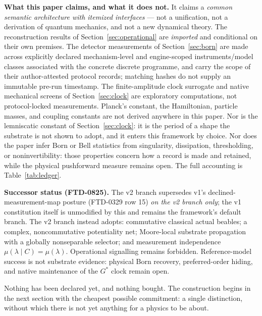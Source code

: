 \documentclass[11pt,a4paper]{article}
\theoremstyle{definition}
\theoremstyle{plain}
\theoremstyle{remark}
\begin{document}
\begin{scopebox}
\textbf{What this paper claims, and what it does not.} It claims a
\emph{common semantic architecture with itemized interfaces} --- not a
unification, not a derivation of quantum mechanics, and not a new
dynamical theory. The reconstruction results of
Section~\ref{sec:operational} are \emph{imported} and conditional on
their own premises. The detector measurements of
Section~\ref{sec:born} are made across explicitly declared mechanism-level
and engine-scoped instruments/model classes associated with the concrete
discrete programme, and carry the scope of their author-attested protocol
records; matching hashes
do not supply an immutable pre-run timestamp. The finite-amplitude clock
surrogate and native mechanical screens of Section~\ref{sec:clock} are
exploratory computations, not protocol-locked measurements. Planck's constant, the Hamiltonian,
particle masses, and coupling constants are not derived anywhere in this
paper. Nor is the lemniscatic constant of Section~\ref{sec:clock}: it is
the period of a shape the substrate is not shown to adopt, and it enters
this framework by choice. Nor does the paper infer Born or Bell statistics
from singularity, dissipation, thresholding, or noninvertibility: those
properties concern how a record is made and retained, while the physical
pushforward measure remains open. The full accounting is
Table~\ref{tab:ledger}.
\end{scopebox}

\begin{scopebox}
\textbf{Successor status (FTD-0825).} The v2 branch supersedes v1's
declined-measurement-map posture (FTD-0329 row 15) \emph{on the v2 branch
only}; the v1 constitution itself is unmodified by this and remains the
framework's default branch. The v2 branch instead adopts: commutative
classical actual beables; a complex,
noncommutative potentiality net; Moore-local substrate propagation with a
globally nonseparable selector; and measurement independence
$\mu(\lambda\mid C)=\mu(\lambda)$. Operational signalling remains forbidden.
Reference-model success is not substrate evidence: physical Born recovery,
preferred-order hiding, and native maintenance of the $G^*$ clock remain
open.
\end{scopebox}

Nothing has been declared yet, and nothing bought. The construction
begins in the next section with the cheapest possible commitment: a
single distinction, without which there is not yet anything for a physics
to be about.
\end{document}
